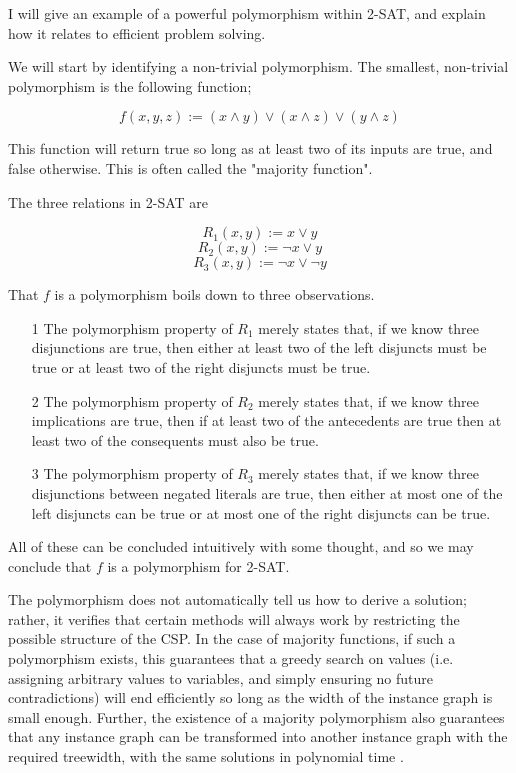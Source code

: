 I will give an example of a powerful polymorphism within 2-SAT, and explain how it relates to efficient problem solving.

We will start by identifying a non-trivial polymorphism. The smallest, non-trivial polymorphism is the following function;

\begin{equation}
    f(x, y, z) := (x \wedge y) \vee (x \wedge z) \vee (y \wedge z)
\end{equation}

This function will return true so long as at least two of its inputs are true, and false otherwise. This is often called the "majority function".

The three relations in 2-SAT are

\begin{equation}
    R_1(x, y) := x \vee y
\end{equation}
\begin{equation}
    R_2(x, y) := \neg x \vee y
\end{equation}
\begin{equation}
    R_3(x, y) := \neg x \vee \neg y
\end{equation}

That $f$ is a polymorphism boils down to three observations.

\begin{itemize}
    \item[1] The polymorphism property of $R_1$ merely states that, if we know three disjunctions are true, then either at least two of the left disjuncts must be true or at least two of the right disjuncts must be true.
    \item[2] The polymorphism property of $R_2$ merely states that, if we know three implications are true, then if at least two of the antecedents are true then at least two of the consequents must also be true.
    \item[3] The polymorphism property of $R_3$ merely states that, if we know three disjunctions between negated literals are true, then either at most one of the left disjuncts can be true or at most one of the right disjuncts can be true.
\end{itemize}

All of these can be concluded intuitively with some thought, and so we may conclude that $f$ is a polymorphism for 2-SAT.

The polymorphism does not automatically tell us how to derive a solution; rather, it verifies that certain methods will always work by restricting the possible structure of the CSP. In the case of majority functions, if such a polymorphism exists, this guarantees that a greedy search on values (i.e. assigning arbitrary values to variables, and simply ensuring no future contradictions) will end efficiently so long as the width of the instance graph is small enough. Further, the existence of a majority polymorphism also guarantees that any instance graph can be transformed into another instance graph with the required treewidth, with the same solutions in polynomial time \citep{feder1998computational}.

